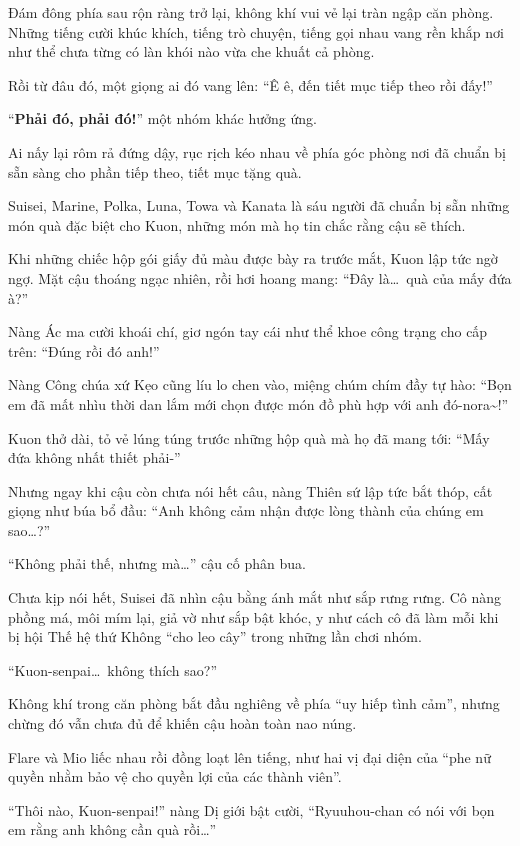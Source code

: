 \documentclass[../main.tex]{subfiles}
\begin{document}
Đám đông phía sau rộn ràng trở lại, không khí vui vẻ lại tràn ngập căn phòng. Những tiếng cười khúc khích, tiếng trò chuyện, tiếng gọi nhau vang rền khắp nơi như thể chưa từng có làn khói nào vừa che khuất cả phòng.

Rồi từ đâu đó, một giọng ai đó vang lên: ``Ê ê, đến tiết mục tiếp theo rồi đấy!''

``\textbf{Phải đó, phải đó!}'' một nhóm khác hưởng ứng.

Ai nấy lại rôm rả đứng dậy, rục rịch kéo nhau về phía góc phòng nơi đã chuẩn bị sẵn sàng cho phần tiếp theo, tiết mục tặng quà.

Suisei, Marine, Polka, Luna, Towa và Kanata là sáu người đã chuẩn bị sẵn những món quà đặc biệt cho Kuon, những món mà họ tin chắc rằng cậu sẽ thích.

Khi những chiếc hộp gói giấy đủ màu được bày ra trước mắt, Kuon lập tức ngờ ngợ. Mặt cậu thoáng ngạc nhiên, rồi hơi hoang mang: ``Đây là\dots\ quà của mấy đứa à?''

Nàng Ác ma cười khoái chí, giơ ngón tay cái như thể khoe công trạng cho cấp trên: ``Đúng rồi đó anh!''

Nàng Công chúa xứ Kẹo cũng líu lo chen vào, miệng chúm chím đầy tự hào: ``Bọn em đã mất nhìu thời dan lắm mới chọn được món đồ phù hợp với anh đó-nora\~{}!''

Kuon thở dài, tỏ vẻ lúng túng trước những hộp quà mà họ đã mang tới: ``Mấy đứa không nhất thiết phải-''

Nhưng ngay khi cậu còn chưa nói hết câu, nàng Thiên sứ lập tức bắt thóp, cất giọng như búa bổ đầu: ``Anh không cảm nhận được lòng thành của chúng em sao\dots?''

``Không phải thế, nhưng mà\dots'' cậu cố phân bua.

Chưa kịp nói hết, Suisei đã nhìn cậu bằng ánh mắt như sắp rưng rưng. Cô nàng phồng má, môi mím lại, giả vờ như sắp bật khóc, y như cách cô đã làm mỗi khi bị hội Thế hệ thứ Không ``cho leo cây'' trong những lần chơi nhóm.

``Kuon-senpai\dots\ không thích sao?''

Không khí trong căn phòng bắt đầu nghiêng về phía ``uy hiếp tình cảm'', nhưng chừng đó vẫn chưa đủ để khiến cậu hoàn toàn nao núng.

Flare và Mio liếc nhau rồi đồng loạt lên tiếng, như hai vị đại diện của ``phe nữ quyền nhằm bảo vệ cho quyền lợi của các thành viên''.

``Thôi nào, Kuon-senpai!'' nàng Dị giới bật cười, ``Ryuuhou-chan có nói với bọn em rằng anh không cần quà rồi\dots''
\end{document}

